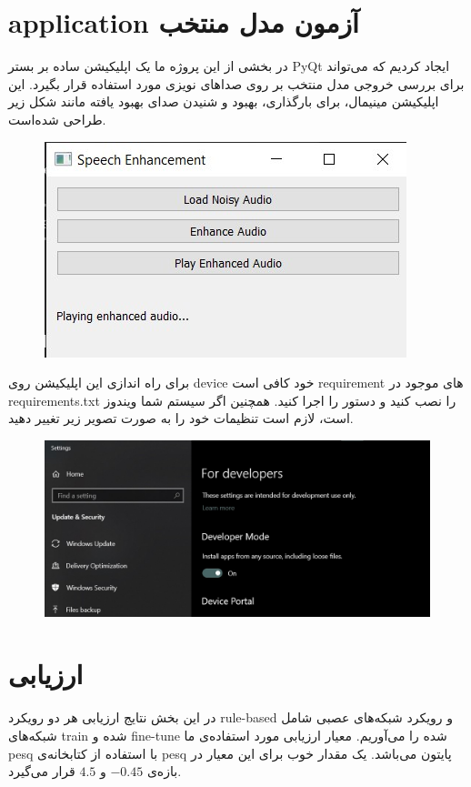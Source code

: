 \documentclass[fleqn]{report}
\begin{document}
\chapter{application آزمون مدل منتخب}
در بخشی از این پروژه ما یک اپلیکیشن ساده بر بستر PyQt ایجاد کردیم که می‌تواند برای بررسی خروجی مدل منتخب بر روی صدا‌های نویزی مورد استفاده قرار بگیرد.
این اپلیکیشن مینیمال، برای بارگذاری، بهبود و شنیدن صدای بهبود یافته مانند شکل زیر طراحی شده‌است.

\begin{figure}[h]

    \centering
    \includegraphics[width=.6\textwidth, keepaspectratio]{images/app.jpg}
    
    \caption{}
    \label{fig:app}
\end{figure}

برای راه اندازی این اپلیکیشن روی device خود کافی است requirement های موجود در requirements.txt را نصب کنید و دستور  را اجرا کنید.
همچنین اگر سیستم شما ویندوز است، لازم است تنظیمات خود را به صورت تصویر زیر تغییر دهید.

\begin{figure}[h]

    \centering
    \includegraphics[width=.6\textwidth, keepaspectratio]{images/setting.jpg}
    
    \caption{}
    \label{fig:setting}
\end{figure}

\chapter{ارزیابی}
در این بخش نتایج ارزیابی هر دو رویکرد rule-based و رویکرد شبکه‌های عصبی شامل شبکه‌های train شده و fine-tune شده را می‌آوریم.
معیار ارزیابی مورد استفاده‌ی ما pesq با استفاده از کتابخانه‌ی pesq پایتون می‌باشد.
یک مقدار خوب برای این معیار در بازه‌ی $-0.45$ و $4.5$ قرار می‌گیرد.
\end{document}
